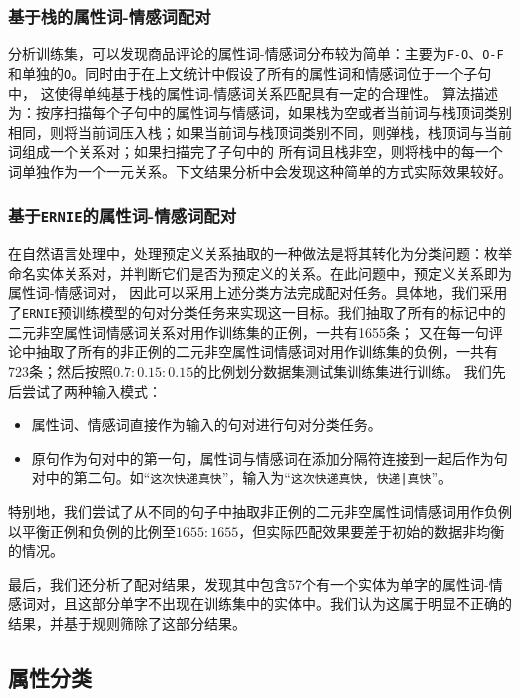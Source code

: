 \documentclass[11pt,a4paper]{article}
\begin{document}
\subsubsection{基于栈的属性词-情感词配对}
分析训练集，可以发现商品评论的属性词-情感词分布较为简单：主要为\texttt{F-O}、\texttt{O-F}和单独的\texttt{O}。同时由于在上文统计中假设了所有的属性词和情感词位于一个子句中，
这使得单纯基于栈的属性词-情感词关系匹配具有一定的合理性。
算法描述为：按序扫描每个子句中的属性词与情感词，如果栈为空或者当前词与栈顶词类别相同，则将当前词压入栈；如果当前词与栈顶词类别不同，则弹栈，栈顶词与当前词组成一个关系对；如果扫描完了子句中的
所有词且栈非空，则将栈中的每一个词单独作为一个一元关系。下文结果分析中会发现这种简单的方式实际效果较好。

\subsubsection{基于\texttt{ERNIE}的属性词-情感词配对}
在自然语言处理中，处理预定义关系抽取的一种做法是将其转化为分类问题：枚举命名实体关系对，并判断它们是否为预定义的关系\cite{zeng2014relation}。在此问题中，预定义关系即为属性词-情感词对，
因此可以采用上述分类方法完成配对任务。具体地，我们采用了\texttt{ERNIE}预训练模型的句对分类任务来实现这一目标。我们抽取了所有的标记中的二元非空属性词情感词关系对用作训练集的正例，一共有1655条；
又在每一句评论中抽取了所有的非正例的二元非空属性词情感词对用作训练集的负例，一共有723条；然后按照$0.7:0.15:0.15$的比例划分数据集测试集训练集进行训练。
我们先后尝试了两种输入模式：

\begin{itemize}
  \item 属性词、情感词直接作为输入的句对进行句对分类任务。
  \item 原句作为句对中的第一句，属性词与情感词在添加分隔符连接到一起后作为句对中的第二句。如“\texttt{这次快递真快}”，输入为“\texttt{这次快递真快, 快递|真快}”。
\end{itemize}

特别地，我们尝试了从不同的句子中抽取非正例的二元非空属性词情感词用作负例以平衡正例和负例的比例至$1655:1655$，但实际匹配效果要差于初始的数据非均衡的情况。

最后，我们还分析了配对结果，发现其中包含57个有一个实体为单字的属性词-情感词对，且这部分单字不出现在训练集中的实体中。我们认为这属于明显不正确的结果，并基于规则筛除了这部分结果。

\subsection{属性分类}
\end{document}
